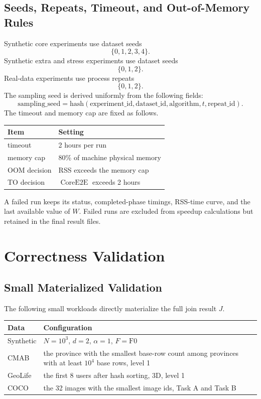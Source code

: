 \documentclass[11pt]{article}
\newcommand{\CoreE}{\ensuremath{\operatorname{CoreE2E}}}
\begin{document}
\subsection{Seeds, Repeats, Timeout, and Out-of-Memory Rules}
Synthetic core experiments use dataset seeds
\[
\{0,1,2,3,4\}.
\]
Synthetic extra and stress experiments use dataset seeds
\[
\{0,1,2\}.
\]
Real-data experiments use process repeats
\[
\{0,1,2\}.
\]
The sampling seed is derived uniformly from the following fields:
\[
\mathrm{sampling\_seed}
=
\mathrm{hash}(\mathrm{experiment\_id},\mathrm{dataset\_id},\mathrm{algorithm},t,\mathrm{repeat\_id}).
\]
The timeout and memory cap are fixed as follows.

\begin{center}
\begin{tabularx}{0.72\linewidth}{@{}lY@{}}
\toprule
Item & Setting \\
\midrule
timeout & 2 hours per run \\
memory cap & 80\% of machine physical memory \\
OOM decision & RSS exceeds the memory cap \\
TO decision & \CoreE{} exceeds 2 hours \\
\bottomrule
\end{tabularx}
\end{center}

A failed run keeps its status, completed-phase timings, RSS-time curve, and the last available value of $W$.  Failed runs are excluded from speedup calculations but retained in the final result files.

\section{Correctness Validation}

\subsection{Small Materialized Validation}
The following small workloads directly materialize the full join result $J$.

\begin{center}
\begin{tabularx}{\linewidth}{@{}lY@{}}
\toprule
Data & Configuration \\
\midrule
Synthetic & $N=10^3$, $d=2$, $\alpha=1$, $F=\mathrm{F0}$ \\
CMAB & the province with the smallest base-row count among provinces with at least $10^4$ base rows, level 1 \\
GeoLife & the first 8 users after hash sorting, 3D, level 1 \\
COCO & the 32 images with the smallest image ids, Task A and Task B \\
\bottomrule
\end{tabularx}
\end{center}
\end{document}
